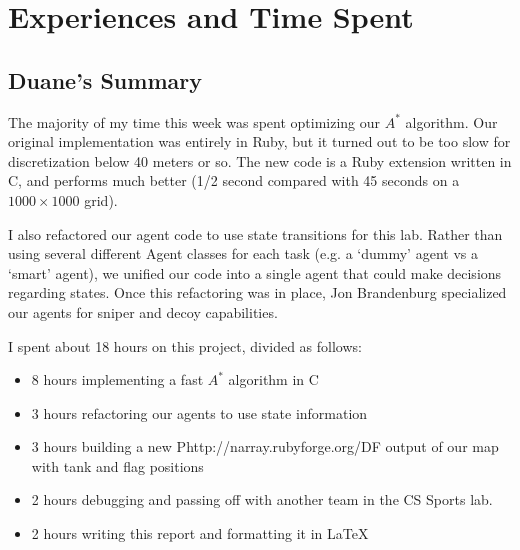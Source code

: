 \chapter{Experiences and Time Spent}\label{chap:exp}
\section{Duane's Summary}
The majority of my time this week was spent optimizing our $A^*$ algorithm.  Our original implementation was entirely in Ruby, but it turned out to be too slow for discretization below 40 meters or so.  The new code is a Ruby extension written in C, and performs much better (1/2 second compared with 45 seconds on a $1000\times 1000$ grid).
\par
I also refactored our agent code to use state transitions for this lab.  Rather than using several different Agent classes for each task (e.g. a `dummy' agent vs a `smart' agent), we unified our code into a single agent that could make decisions regarding states.  Once this refactoring was in place, Jon Brandenburg specialized our agents for sniper and decoy capabilities.
\par
I spent about 18 hours on this project, divided as follows:
\begin{itemize}
    \item 8 hours implementing a fast $A^*$ algorithm in C
    \item 3 hours refactoring our agents to use state information
    \item 3 hours building a new Phttp://narray.rubyforge.org/DF output of our map with tank and flag positions
    \item 2 hours debugging and passing off with another team in the CS Sports lab.
    \item 2 hours writing this report and formatting it in \LaTeX
\end{itemize}

